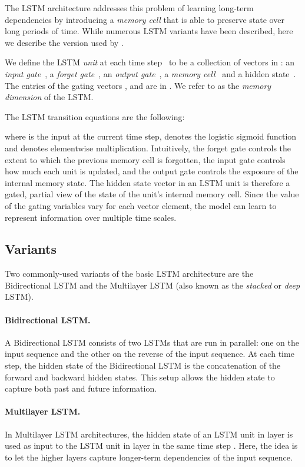 \documentclass[11pt]{article}
\begin{document}
The LSTM architecture \citep{hochreiter1997long} addresses this problem of learning long-term dependencies by introducing a \emph{memory cell} that is able to preserve state over long periods of time. While numerous LSTM variants have been described, here we describe the version used by \citet{zaremba2014learning}.

We define the LSTM \emph{unit} at each time step~ to be a collection of vectors in : an \emph{input gate}~, a \emph{forget gate}~,  an \emph{output gate}~, a \emph{memory cell}~ and a hidden state~. The entries of the gating vectors ,  and  are in . We refer to  as the \emph{memory dimension} of the LSTM.

The LSTM transition equations are the following:

where  is the input at the current time step,  denotes the logistic sigmoid function and  denotes elementwise multiplication. Intuitively, the forget gate controls the extent to which the previous memory cell is forgotten, the input gate controls how much each unit is updated, and the output gate controls the exposure of the internal memory state. The hidden state vector in an LSTM unit is therefore a gated, partial view of the state of the unit's internal memory cell. Since the value of the gating variables vary for each vector element, the model can learn to represent information over multiple time scales.

\subsection{Variants}

Two commonly-used variants of the basic LSTM architecture are the Bidirectional LSTM and the Multilayer LSTM (also known as the \emph{stacked} or \emph{deep} LSTM).

\paragraph{Bidirectional LSTM.} A Bidirectional LSTM \citep{graves2013hybrid} consists of two LSTMs that are run in parallel: one on the input sequence and the other on the reverse of the input sequence. At each time step, the hidden state of the Bidirectional LSTM is the concatenation of the forward and backward hidden states. This setup allows the hidden state to capture both past and future information.

\paragraph{Multilayer LSTM.} In Multilayer LSTM architectures, the hidden state of an LSTM unit in layer  is used as input to the LSTM unit in layer  in the same time step \citep{graves2013hybrid,sutskever2014sequence,zaremba2014learning}. Here, the idea is to let the higher layers capture longer-term dependencies of the input sequence.
\end{document}
